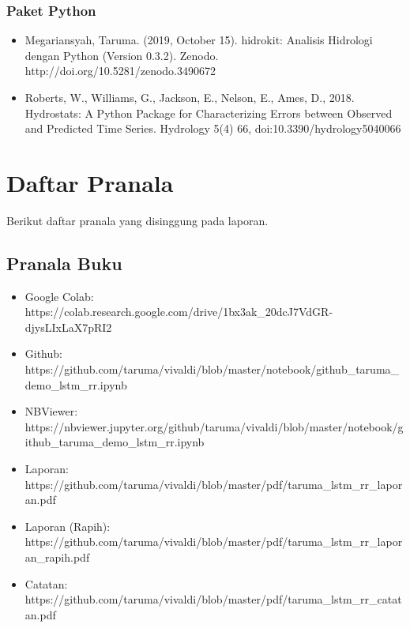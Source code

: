 \documentclass[11pt]{article}
\providecommand{\tightlist}{%
      \setlength{\itemsep}{0pt}\setlength{\parskip}{0pt}}
\begin{document}
\hypertarget{paket-python}{%
\subsubsection{Paket Python}\label{paket-python}}

\begin{itemize}
\tightlist
\item
  Megariansyah, Taruma. (2019, October 15). hidrokit: Analisis Hidrologi
  dengan Python (Version 0.3.2). Zenodo.
  http://doi.org/10.5281/zenodo.3490672
\item
  Roberts, W., Williams, G., Jackson, E., Nelson, E., Ames, D., 2018.
  Hydrostats: A Python Package for Characterizing Errors between
  Observed and Predicted Time Series. Hydrology 5(4) 66,
  doi:10.3390/hydrology5040066
\end{itemize}

    \hypertarget{daftar-pranala}{%
\section{Daftar Pranala}\label{daftar-pranala}}

Berikut daftar pranala yang disinggung pada laporan.

    \hypertarget{pranala-buku}{%
\subsection{Pranala Buku}\label{pranala-buku}}

\begin{itemize}
\tightlist
\item
  Google Colab:
  https://colab.research.google.com/drive/1bx3ak\_20dcJ7VdGR-djysLIxLaX7pRI2
\item
  Github:
  https://github.com/taruma/vivaldi/blob/master/notebook/github\_taruma\_demo\_lstm\_rr.ipynb
\item
  NBViewer:
  https://nbviewer.jupyter.org/github/taruma/vivaldi/blob/master/notebook/github\_taruma\_demo\_lstm\_rr.ipynb
\item
  Laporan:
  https://github.com/taruma/vivaldi/blob/master/pdf/taruma\_lstm\_rr\_laporan.pdf
\item
  Laporan (Rapih):
  https://github.com/taruma/vivaldi/blob/master/pdf/taruma\_lstm\_rr\_laporan\_rapih.pdf
\item
  Catatan:
  https://github.com/taruma/vivaldi/blob/master/pdf/taruma\_lstm\_rr\_catatan.pdf
\end{itemize}
\end{document}
